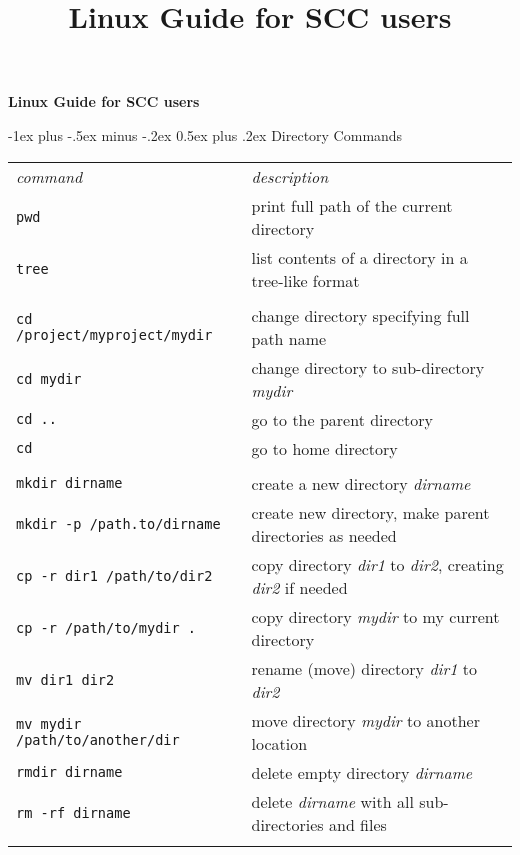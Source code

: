 \documentclass[10pt,landscape]{article}
\title{ Linux Guide for SCC users}
\makeatletter
\renewcommand{\section}{\@startsection{section}{1}{0mm}%
                                {-1ex plus -.5ex minus -.2ex}%
                                {0.5ex plus .2ex}%
                                {\normalfont\large\bfseries}}
\makeatother
\begin{document}
\raggedright
\footnotesize

\begin{center}
     \LARGE{\textbf{ Linux Guide for SCC users}} \\
\end{center}

\begin{multicols}{2}
\setlength{\premulticols}{1pt}
\setlength{\postmulticols}{1pt}
\setlength{\multicolsep}{1pt}
\setlength{\columnsep}{1pt}

\section{Directory Commands}
\begin{tabular}{ll}
\emph{command} & \emph{description} \\

\verb!pwd! & print full path of the current directory\\
\verb!tree! & list contents of a directory in a tree-like format\\\\
\texttt{cd /project/myproject/mydir} & change directory specifying full path name\\
\texttt{cd mydir} & change directory to sub-directory \textit{mydir}\\
\texttt{cd ..} & go to the parent directory\\
\texttt{cd } & go to home directory\\
\\
\texttt{mkdir dirname } & create a new directory \textit{dirname}\\
\texttt{mkdir -p /path.to/dirname } & create new directory, make parent directories as needed\\
\texttt{cp -r dir1 /path/to/dir2} & copy directory \textit{dir1} to \textit{dir2}, creating \textit{dir2} if needed\\
\texttt{cp -r /path/to/mydir  .} & copy directory \textit{mydir} to my current directory\\
\texttt{mv dir1 dir2} & rename (move) directory \textit{dir1} to \textit{dir2}\\
\texttt{mv mydir /path/to/another/dir} & move directory \textit{mydir} to another location\\ 
\texttt{rmdir dirname } & delete empty directory \textit{dirname}\\
\texttt{rm -rf dirname } & delete \textit{dirname} with all sub-directories and files\\\\
\end{tabular}



\end{multicols}
\end{document}
